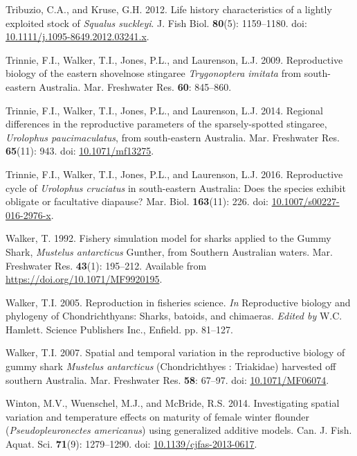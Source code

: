 \documentclass[
]{article}
\newenvironment{CSLReferences}%
  {}%
  {\par}
\begin{document}
\begin{CSLReferences}{1}{0}
Tribuzio, C.A., and Kruse, G.H. 2012. Life history characteristics of a lightly exploited stock of \emph{{Squalus} suckleyi}. J. Fish Biol. \textbf{80}(5): 1159--1180. doi: \href{https://doi.org/10.1111/j.1095-8649.2012.03241.x}{10.1111/j.1095-8649.2012.03241.x}.

Trinnie, F.I., Walker, T.I., Jones, P.L., and Laurenson, L.J. 2009. Reproductive biology of the eastern shovelnose stingaree \emph{{Trygonoptera} imitata} from south-eastern {Australia}. Mar. Freshwater Res. \textbf{60}: 845--860.

Trinnie, F.I., Walker, T.I., Jones, P.L., and Laurenson, L.J. 2014. Regional differences in the reproductive parameters of the sparsely-spotted stingaree, {\emph{Urolophus paucimaculatus}}, from south-eastern Australia. Mar. Freshwater Res. \textbf{65}(11): 943. doi: \href{https://doi.org/10.1071/mf13275}{10.1071/mf13275}.

Trinnie, F.I., Walker, T.I., Jones, P.L., and Laurenson, L.J. 2016. Reproductive cycle of \emph{{Urolophus} cruciatus} in south-eastern {Australia}: {Does} the species exhibit obligate or facultative diapause? Mar. Biol. \textbf{163}(11): 226. doi: \href{https://doi.org/10.1007/s00227-016-2976-x}{10.1007/s00227-016-2976-x}.

Walker, T. 1992. Fishery simulation model for sharks applied to the {Gummy} {Shark}, \emph{{Mustelus} antarcticus} {Gunther}, from {Southern} {Australian} waters. Mar. Freshwater Res. \textbf{43}(1): 195--212. Available from \url{https://doi.org/10.1071/MF9920195}.

Walker, T.I. 2005. Reproduction in fisheries science. \emph{In} Reproductive biology and phylogeny of {Chondrichthyans}: Sharks, batoids, and chimaeras. \emph{Edited by} W.C. Hamlett. Science Publishers Inc., Enfield. pp. 81--127.

Walker, T.I. 2007. Spatial and temporal variation in the reproductive biology of gummy shark \emph{{Mustelus} antarcticus} ({Chondrichthyes} : {Triakidae}) harvested off southern {Australia}. Mar. Freshwater Res. \textbf{58}: 67--97. doi: \href{https://doi.org/10.1071/MF06074}{10.1071/MF06074}.

Winton, M.V., Wuenschel, M.J., and McBride, R.S. 2014. Investigating spatial variation and temperature effects on maturity of female winter flounder ({\emph{Pseudopleuronectes americanus}}) using generalized additive models. Can. J. Fish. Aquat. Sci. \textbf{71}(9): 1279--1290. doi: \href{https://doi.org/10.1139/cjfas-2013-0617}{10.1139/cjfas-2013-0617}.


\end{CSLReferences}
\end{document}

